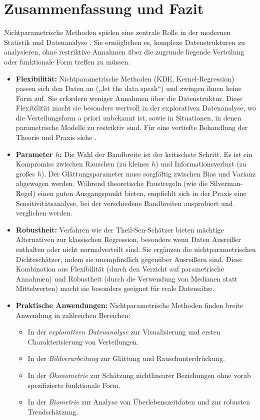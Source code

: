 \documentclass[a4paper, 11pt]{scrartcl}
\begin{document}
\section{Zusammenfassung und Fazit}

Nichtparametrische Methoden spielen eine zentrale Rolle in der modernen Statistik und Datenanalyse \cite{BüningTrenkler+1994, Wasserman2006}. Sie ermöglichen es, komplexe Datenstrukturen zu analysieren, ohne restriktive Annahmen über die zugrunde liegende Verteilung oder funktionale Form treffen zu müssen.

\begin{itemize}
	\item \textbf{Flexibilität:} Nichtparametrische Methoden (KDE, Kernel-Regression) passen sich den Daten an (,,let the data speak``) und zwingen ihnen keine Form auf. Sie erfordern weniger Annahmen über die Datenstruktur. Diese Flexibilität macht sie besonders wertvoll in der explorativen Datenanalyse, wo die Verteilungsform a priori unbekannt ist, sowie in Situationen, in denen parametrische Modelle zu restriktiv sind. Für eine vertiefte Behandlung der Theorie und Praxis siehe \cite{Silverman1986, Wand1995, Scott1992}.
	
	\item \textbf{Parameter $h$:} Die Wahl der Bandbreite ist der kritischste Schritt. Es ist ein Kompromiss zwischen Rauschen (zu kleines $h$) und Informationsverlust (zu großes $h$). Der Glättungsparameter muss sorgfältig zwischen Bias und Varianz abgewogen werden. Während theoretische Faustregeln (wie die Silverman-Regel) einen guten Ausgangspunkt bieten, empfiehlt sich in der Praxis eine Sensitivitätsanalyse, bei der verschiedene Bandbreiten ausprobiert und verglichen werden.
	
	\item \textbf{Robustheit:} Verfahren wie der Theil-Sen-Schätzer bieten mächtige Alternativen zur klassischen Regression, besonders wenn Daten Ausreißer enthalten oder nicht normalverteilt sind. Sie ergänzen die nichtparametrischen Dichteschätzer, indem sie unempfindlich gegenüber Ausreißern sind. Diese Kombination aus Flexibilität (durch den Verzicht auf parametrische Annahmen) und Robustheit (durch die Verwendung von Medianen statt Mittelwerten) macht sie besonders geeignet für reale Datensätze.
	
	\item \textbf{Praktische Anwendungen:} Nichtparametrische Methoden finden breite Anwendung in zahlreichen Bereichen:
	      \begin{itemize}
	      	\item In der \textit{explorativen Datenanalyse} zur Visualisierung und ersten Charakterisierung von Verteilungen.
	      	\item In der \textit{Bildverarbeitung} zur Glättung und Rauschunterdrückung.
	      	\item In der \textit{Ökonometrie} zur Schätzung nichtlinearer Beziehungen ohne vorab spezifizierte funktionale Form.
	      	\item In der \textit{Biometrie} zur Analyse von Überlebenszeitdaten und zur robusten Trendschätzung.
	      \end{itemize}
	

\end{itemize}
\end{document}
